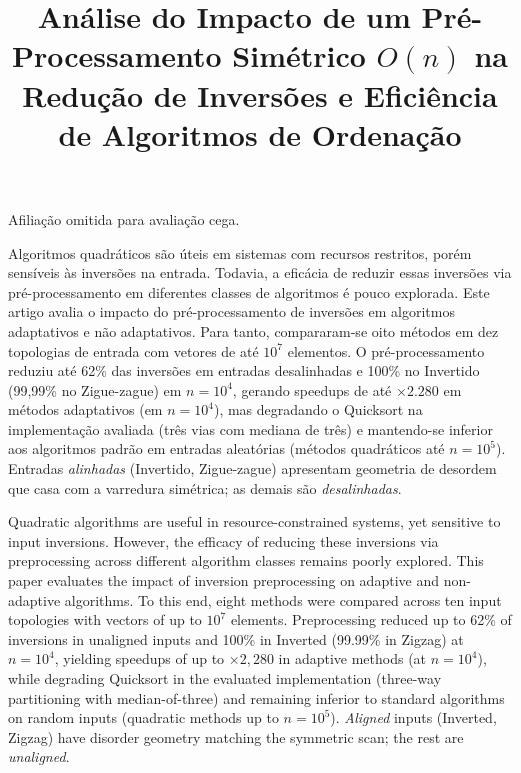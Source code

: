 \documentclass[portuguese]{sbc2025}%
\title[Pré-processamento simétrico para ordenação]{Análise do Impacto de um Pré-Processamento Simétrico $O(n)$ na Redução de Inversões e Eficiência de Algoritmos de Ordenação}
\author[Autor 2026]{
\affil{\textbf{Autor}}

}
\begin{document}
\begin{frontmatter}

\maketitle

\begin{mail}
Afiliação omitida para avaliação cega.
\end{mail}
\vspace*{30pt}

\begin{abstract-pt}
Algoritmos quadráticos são úteis em sistemas com recursos restritos, porém sensíveis às inversões na entrada. Todavia, a eficácia de reduzir essas inversões via pré-processamento em diferentes classes de algoritmos é pouco explorada. Este artigo avalia o impacto do pré-processamento de inversões em algoritmos adaptativos e não adaptativos. Para tanto, compararam-se oito métodos em dez topologias de entrada com vetores de até $10^7$ elementos. O pré-processamento reduziu até 62\% das inversões em entradas desalinhadas e 100\% no Invertido (99,99\% no Zigue-zague) em $n{=}10^4$, gerando speedups de até $\times 2.280$ em métodos adaptativos (em $n{=}10^4$), mas degradando o Quicksort na implementação avaliada (três vias com mediana de três) e mantendo-se inferior aos algoritmos padrão em entradas aleatórias (métodos quadráticos até $n{=}10^5$). Entradas \emph{alinhadas} (Invertido, Zigue-zague) apresentam geometria de desordem que casa com a varredura simétrica; as demais são \emph{desalinhadas}.
\end{abstract-pt}

\begin{abstract-en}
Quadratic algorithms are useful in resource-constrained systems, yet sensitive to input inversions. However, the efficacy of reducing these inversions via preprocessing across different algorithm classes remains poorly explored. This paper evaluates the impact of inversion preprocessing on adaptive and non-adaptive algorithms. To this end, eight methods were compared across ten input topologies with vectors of up to $10^7$ elements. Preprocessing reduced up to 62\% of inversions in unaligned inputs and 100\% in Inverted (99.99\% in Zigzag) at $n{=}10^4$, yielding speedups of up to $\times 2{,}280$ in adaptive methods (at $n{=}10^4$), while degrading Quicksort in the evaluated implementation (three-way partitioning with median-of-three) and remaining inferior to standard algorithms on random inputs (quadratic methods up to $n{=}10^5$). \emph{Aligned} inputs (Inverted, Zigzag) have disorder geometry matching the symmetric scan; the rest are \emph{unaligned}.
\end{abstract-en}


\end{frontmatter}
\end{document}
